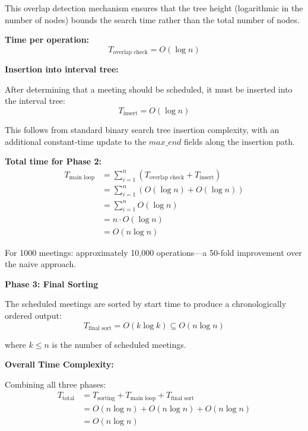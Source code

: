 \documentclass[conference]{IEEEtran}
\begin{document}
This overlap detection mechanism ensures that the tree height (logarithmic in the number of nodes) bounds the search time rather than the total number of nodes.

\textbf{Time per operation:}
\begin{equation}
T_{\text{overlap check}} = O(\log n)
\end{equation}

\textbf{Insertion into interval tree:}

After determining that a meeting should be scheduled, it must be inserted into the interval tree:
\begin{equation}
T_{\text{insert}} = O(\log n)
\end{equation}

This follows from standard binary search tree insertion complexity, with an additional constant-time update to the $max\_end$ fields along the insertion path.

\textbf{Total time for Phase 2:}
\begin{align}
T_{\text{main loop}} &= \sum_{i=1}^{n} (T_{\text{overlap check}} + T_{\text{insert}}) \\
&= \sum_{i=1}^{n} (O(\log n) + O(\log n)) \\
&= \sum_{i=1}^{n} O(\log n) \\
&= n \cdot O(\log n) \\
&= O(n \log n)
\end{align}

For 1000 meetings: approximately 10,000 operations—a 50-fold improvement over the naive approach.

\vspace{0.5em}

\textbf{Phase 3: Final Sorting}

The scheduled meetings are sorted by start time to produce a chronologically ordered output:
\begin{equation}
T_{\text{final sort}} = O(k \log k) \subseteq O(n \log n)
\end{equation}

where $k \leq n$ is the number of scheduled meetings.

\vspace{0.5em}

\textbf{Overall Time Complexity:}

Combining all three phases:
\begin{align}
T_{\text{total}} &= T_{\text{sorting}} + T_{\text{main loop}} + T_{\text{final sort}} \\
&= O(n \log n) + O(n \log n) + O(n \log n) \\
&= O(n \log n)
\end{align}
\end{document}
